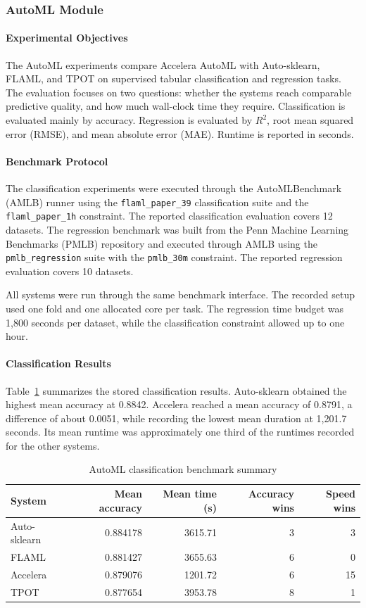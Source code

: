\documentclass[12pt,a4paper]{report}
\newcommand{\modulepath}[1]{\texttt{#1}}
\begin{document}
\subsubsection{AutoML Module}
\paragraph{Experimental Objectives}
The AutoML experiments compare Accelera AutoML with Auto-sklearn, FLAML, and
TPOT on supervised tabular classification and regression tasks. The evaluation
focuses on two questions: whether the systems reach comparable predictive
quality, and how much wall-clock time they require. Classification is evaluated
mainly by accuracy. Regression is evaluated by $R^2$, root mean squared error
(RMSE), and mean absolute error (MAE). Runtime is reported in seconds.

\paragraph{Benchmark Protocol}
The classification experiments were executed through the AutoMLBenchmark
(AMLB) runner using the \modulepath{flaml\_paper\_39} classification suite and
the \modulepath{flaml\_paper\_1h} constraint. The reported classification
evaluation covers 12 datasets. The regression benchmark was built from the Penn
Machine Learning Benchmarks (PMLB) repository and executed through AMLB using
the \modulepath{pmlb\_regression} suite with the \modulepath{pmlb\_30m}
constraint. The reported regression evaluation covers 10 datasets.

All systems were run through the same benchmark interface. The recorded setup
used one fold and one allocated core per task. The regression time budget was
1,800 seconds per dataset, while the classification constraint allowed up to
one hour.

\paragraph{Classification Results}
Table~\ref{tab:automl_classification_results} summarizes the stored
classification results. Auto-sklearn obtained the highest mean accuracy at
0.8842. Accelera reached a mean accuracy of 0.8791, a difference of about
0.0051, while recording the lowest mean duration at 1,201.7 seconds. Its mean
runtime was approximately one third of the runtimes recorded for the other
systems.

\begin{table}[H]
\centering
\caption{AutoML classification benchmark summary}
\label{tab:automl_classification_results}
\begin{tabular}{lrrrr}
\toprule
System & Mean accuracy & Mean time (s) & Accuracy wins & Speed wins \\
\midrule
Auto-sklearn & 0.884178 & 3615.71 & 3 & 3 \\
FLAML        & 0.881427 & 3655.63 & 6 & 0 \\
Accelera     & 0.879076 & 1201.72 & 6 & 15 \\
TPOT         & 0.877654 & 3953.78 & 8 & 1 \\
\bottomrule
\end{tabular}
\end{table}
\end{document}
